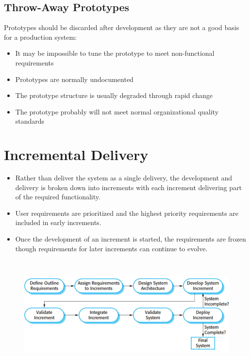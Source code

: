 \documentclass{report}
\begin{document}
\subsection{Throw-Away Prototypes}
\noindent Prototypes should be discarded after development as they are not a good basis for a production system:
\begin{itemize}
  \item It may be impossible to tune the prototype to meet non-functional requirements
  \item Prototypes are normally undocumented
  \item The prototype structure is usually degraded through rapid change
  \item The prototype probably will not meet normal organizational quality standards
\end{itemize}


\section{Incremental Delivery}
\vspace{-1em}
\begin{multicols}{2}
\begin{itemize}
  \item Rather than deliver the system as a single delivery, the development and delivery is broken down into increments with each increment delivering part of the required functionality.
  \item User requirements are prioritized and the highest priority requirements are included in early increments.
  \item Once the development of an increment is started, the requirements are frozen though requirements for later increments can continue to evolve.
\end{itemize}\ \newline
\begin{figure}[H]
\centering
\includegraphics[scale=.35,trim=1cm 1cm 1cm 1cm]{assets/CEN4010_Incremental_Delivery.jpg}
\end{figure}
\vfill\columnbreak
\end{multicols}
  
\end{document}
